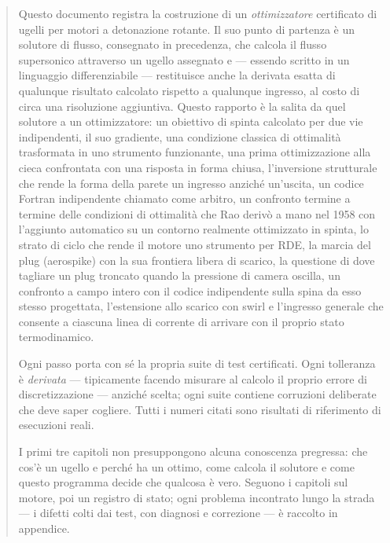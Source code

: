 



\maketitle

\begin{abstract}
\noindent
Questo documento registra la costruzione di un \emph{ottimizzatore}
certificato di ugelli per motori a detonazione rotante. Il suo punto
di partenza è un solutore di flusso, consegnato in precedenza, che
calcola il flusso supersonico attraverso un ugello assegnato e ---
essendo scritto in un linguaggio differenziabile --- restituisce
anche la derivata esatta di qualunque risultato calcolato rispetto a
qualunque ingresso, al costo di circa una risoluzione aggiuntiva.
Questo rapporto è la salita da quel solutore a un ottimizzatore: un
obiettivo di spinta calcolato per due vie indipendenti, il suo
gradiente, una condizione classica di ottimalità trasformata in uno
strumento funzionante, una prima ottimizzazione alla cieca
confrontata con una risposta in forma chiusa, l'inversione
strutturale che rende la forma della parete un ingresso anziché
un'uscita, un codice Fortran indipendente chiamato come arbitro, un
confronto termine a termine delle condizioni di ottimalità che Rao
derivò a mano nel 1958 con l'aggiunto automatico su un contorno
realmente ottimizzato in spinta, lo strato di ciclo che rende il
motore uno strumento per RDE, la marcia del plug (aerospike) con la
sua frontiera libera di scarico, la questione di dove tagliare un
plug troncato quando la pressione di camera oscilla, un confronto a
campo intero con il codice indipendente sulla spina da esso stesso
progettata, l'estensione allo scarico con swirl e l'ingresso
generale che consente a ciascuna linea di corrente di arrivare con
il proprio stato termodinamico.

Ogni passo porta con sé la propria suite di test certificati. Ogni
tolleranza è \emph{derivata} --- tipicamente facendo misurare al
calcolo il proprio errore di discretizzazione --- anziché scelta;
ogni suite contiene corruzioni deliberate che deve saper cogliere.
Tutti i numeri citati sono risultati di riferimento di esecuzioni
reali.

I primi tre capitoli non presuppongono alcuna conoscenza pregressa:
che cos'è un ugello e perché ha un ottimo, come calcola il solutore
e come questo programma decide che qualcosa è vero. Seguono i
capitoli sul motore, poi un registro di stato; ogni problema
incontrato lungo la strada --- i difetti colti dai test, con
diagnosi e correzione --- è raccolto in appendice.
\end{abstract}

